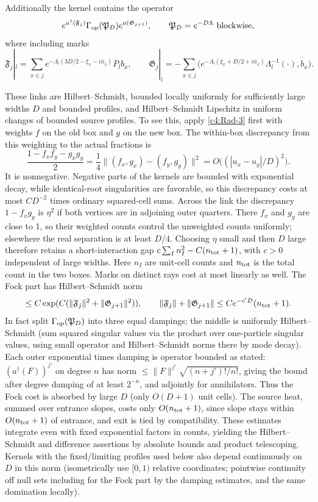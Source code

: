 Additionally the kernel contains the operator
\[
 e^{a^\dagger(\mathfrak F_j)}\Gamma_{\rm op}(\mathfrak P_D)e^{a(\mathfrak G_{j+1})},\qquad
 \mathfrak P_D=e^{-D\Lambda}\ {\rm blockwise},
\]
where including marks
\[
 \mathfrak F_j|_l=\sum_{x\in j}e^{-\Lambda_l(3D/2-\xi_x-i\phi_x)}P_l b_x,\qquad
 \mathfrak G_j|_l=-\sum_{x\in j}\big(e^{-\Lambda_l(\xi_x+D/2+i\phi_x)}\Lambda_l^{-1}(\cdot),b_x\big).
\]

These links are Hilbert--Schmidt, bounded locally uniformly for
sufficiently large widths \(D\) and bounded profiles, and Hilbert--Schmidt
Lipschitz in uniform changes of bounded source profiles. To see this,
apply \eqref{c4:Rad-3} first with weights \(f\) on the old box and \(g\)
on the new box. The within-box discrepancy from this weighting to the
actual fractions is
\[
 \frac{1-f_xf_y-g_xg_y}{2}
 =\frac14\big\|(f_x,g_x)-(f_y,g_y)\big\|^2
 =O\big((|u_x-u_y|/D)^2\big).
\]
It is nonnegative. Negative parts of the kernels are bounded with
exponential decay, while identical-root singularities are favorable,
so this discrepancy costs at most \(C D^{-2}\) times ordinary
squared-cell sums. Across the link the discrepancy \(1-f_xg_y\) is
\(\eta^2\) if both vertices are in adjoining outer quarters. There
\(f_x\) and \(g_y\) are close to 1, so their weighted counts control
the unweighted counts uniformly; elsewhere the real separation is at
least \(D/4\). Choosing \(\eta\) small and then \(D\) large therefore
retains a short-interaction gap
\(c\sum_I n_I^2-C(n_{\rm tot}+1)\), with \(c>0\) independent of large
widths. Here \(n_I\) are unit-cell counts and \(n_{\rm tot}\) is the total
count in the two boxes. Marks on distinct rays cost at most linearly
as well. The Fock part has Hilbert--Schmidt norm
\[
 \le C\exp(C(\|\mathfrak F_j\|^2+\|\mathfrak G_{j+1}\|^2)),\qquad
 \|\mathfrak F_j\|+\|\mathfrak G_{j+1}\|\le C e^{-c' D}(n_{\rm tot}+1).
\]
In fact split \(\Gamma_{\rm op}(\mathfrak P_D)\) into three equal dampings; the middle is uniformly Hilbert--Schmidt (sum squared singular values via the product over one-particle singular values, using small operator and Hilbert--Schmidt norms there by mode decay). Each outer exponential times damping is operator bounded as stated: \((a^\dagger(F))^{j'}\) on degree \(n\) has norm \(\le\|F\|^{j'}\sqrt{(n+j')!/n!}\), giving the bound after degree damping of at least \(2^{-n}\), and adjointly for annihilators. Thus the Fock cost is absorbed by large \(D\) (only \(O(D+1)\) unit cells). The source heat, summed over entrance slopes, costs only \(O(n_{\rm tot}+1)\), since slope stays within \(O(n_{\rm tot}+1)\) of entrance, and exit is tied by compatibility. These estimates integrate even with fixed exponential factors in counts, yielding the Hilbert--Schmidt and difference assertions by absolute bounds and product telescoping. Kernels with the fixed/limiting profiles used below also depend continuously on \(D\) in this norm (isometrically use \([0,1)\) relative coordinates; pointwise continuity off null sets including for the Fock part by the damping estimates, and the same domination locally).

